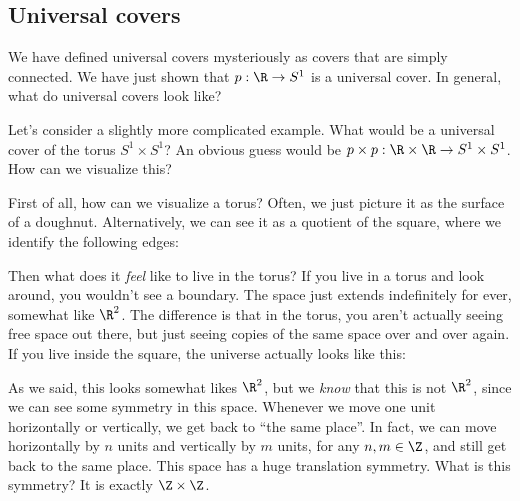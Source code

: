 \documentclass[a4paper]{article}
\begin{document}
\subsection{Universal covers}
We have defined universal covers mysteriously as covers that are simply connected. We have just shown that $p: \R\to S^1$ is a universal cover. In general, what do universal covers look like?

Let's consider a slightly more complicated example. What would be a universal cover of the torus $S^1 \times S^1$? An obvious guess would be $p\times p: \R\times \R \to S^1 \times S^1$. How can we visualize this?

First of all, how can we visualize a torus? Often, we just picture it as the surface of a doughnut. Alternatively, we can see it as a quotient of the square, where we identify the following edges:
\begin{center}
\end{center}
Then what does it \emph{feel} like to live in the torus? If you live in a torus and look around, you wouldn't see a boundary. The space just extends indefinitely for ever, somewhat like $\R^2$. The difference is that in the torus, you aren't actually seeing free space out there, but just seeing copies of the same space over and over again. If you live inside the square, the universe actually looks like this:
\begin{center}
\end{center}
As we said, this looks somewhat likes $\R^2$, but we \emph{know} that this is not $\R^2$, since we can see some symmetry in this space. Whenever we move one unit horizontally or vertically, we get back to ``the same place''. In fact, we can move horizontally by $n$ units and vertically by $m$ units, for any $n, m \in \Z$, and still get back to the same place. This space has a huge translation symmetry. What is this symmetry? It is exactly $\Z \times \Z$.
\end{document}
